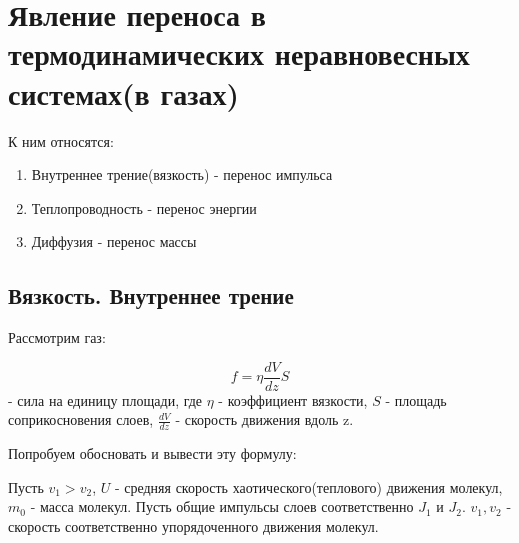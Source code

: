 \documentclass[12pt,a4paper]{report}
\begin{document}
\section{Явление переноса в термодинамических неравновесных системах(в газах)}
К ним относятся:
\begin{enumerate}
    \item Внутреннее трение(вязкость) - перенос импульса
    \item Теплопроводность - перенос энергии
    \item Диффузия - перенос массы
\end{enumerate}

\subsection{Вязкость. Внутреннее трение}
Рассмотрим газ:
\begin{center}
\end{center}
\[ f = \eta \frac{dV}{dz}S\]
- сила на единицу площади, где $\eta$ - коэффициент вязкости, $S$ - площадь соприкосновения слоев, $\frac{dV}{dz}$ - скорость движения вдоль z.

\vspace{4px}

Попробуем обосновать и вывести эту формулу:

\vspace{4px}

Пусть $v_1 > v_2$, $U$ - средняя скорость хаотического(теплового) движения молекул, $m_0$ - масса молекул. Пусть общие импульсы слоев соответственно $J_1$ и $J_2$. $v_1, v_2$ - скорость соответственно упорядоченного движения молекул.
\end{document}
